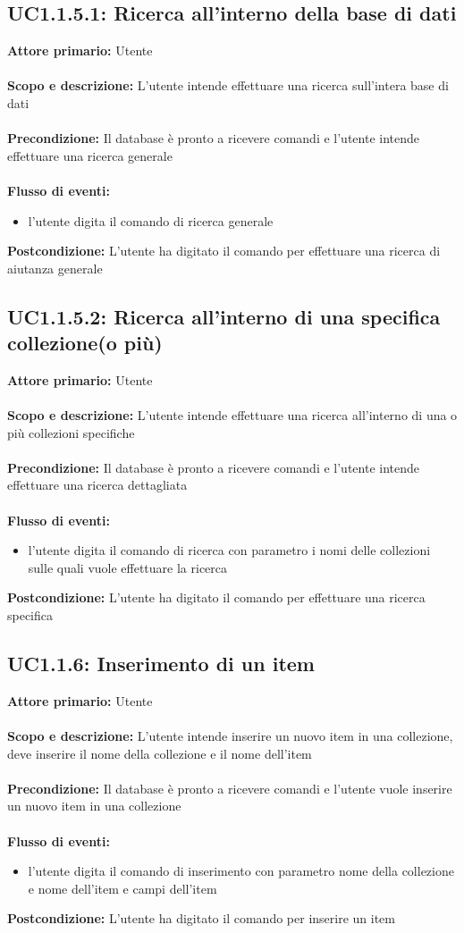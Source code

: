 \documentclass{scalatekids-article}
\begin{document}
\subsection{UC1.1.5.1: Ricerca all'interno della base di dati}
\textbf{Attore primario:} Utente \\ \\
\textbf{Scopo e descrizione:} L’utente intende effettuare una ricerca sull’intera base di dati\\ \\
\textbf{Precondizione:} Il database è pronto a ricevere comandi e l’utente intende effettuare una ricerca generale\\ \\
\textbf{Flusso di eventi:}
\begin{itemize}
\item l’utente digita il comando di ricerca generale
\end{itemize}
\textbf{Postcondizione:} L’utente ha digitato il comando per effettuare una ricerca di aiutanza generale
\subsection{UC1.1.5.2: Ricerca all'interno di una specifica collezione(o più)}
\textbf{Attore primario:} Utente \\ \\
\textbf{Scopo e descrizione:} L’utente intende effettuare una ricerca all’interno di una o più collezioni specifiche\\ \\
\textbf{Precondizione:} Il database è pronto a ricevere comandi e l’utente intende effettuare una ricerca dettagliata\\ \\
\textbf{Flusso di eventi:}
\begin{itemize}
\item l’utente digita il comando di ricerca con parametro i nomi delle collezioni sulle quali vuole effettuare la ricerca
\end{itemize}
\textbf{Postcondizione:} L’utente ha digitato il comando per effettuare una ricerca specifica
\subsection{UC1.1.6: Inserimento di un item}
\textbf{Attore primario:} Utente \\ \\
\textbf{Scopo e descrizione:} L’utente intende inserire un nuovo item in una collezione, deve inserire il nome della collezione e il nome dell’item\\ \\
\textbf{Precondizione:} Il database è pronto a ricevere comandi e l’utente vuole inserire un nuovo item in una collezione\\ \\
\textbf{Flusso di eventi:}
\begin{itemize}
\item l’utente digita il comando di inserimento con parametro nome della collezione e nome dell’item e campi dell’item
\end{itemize}
\textbf{Postcondizione:} L’utente ha digitato il comando per inserire un item
\end{document}
